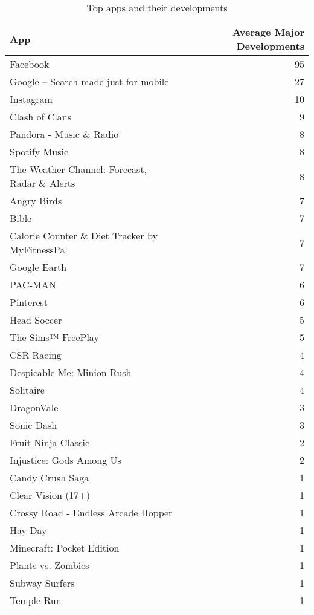 \documentclass[
]{article}
\begin{document}
\begin{table}[!h]

\caption{\label{tab:app-tab}Top apps and their developments}
\centering
\begin{tabular}[t]{l|r}
\hline
App & Average Major Developments\\
\hline
\rowcolor{gray!6}  Facebook & 95\\
\hline
Google – Search made just for mobile & 27\\
\hline
\rowcolor{gray!6}  Instagram & 10\\
\hline
Clash of Clans & 9\\
\hline
\rowcolor{gray!6}  Pandora - Music \& Radio & 8\\
\hline
Spotify Music & 8\\
\hline
\rowcolor{gray!6}  The Weather Channel: Forecast, Radar \& Alerts & 8\\
\hline
Angry Birds & 7\\
\hline
\rowcolor{gray!6}  Bible & 7\\
\hline
Calorie Counter \& Diet Tracker by MyFitnessPal & 7\\
\hline
\rowcolor{gray!6}  Google Earth & 7\\
\hline
PAC-MAN & 6\\
\hline
\rowcolor{gray!6}  Pinterest & 6\\
\hline
Head Soccer & 5\\
\hline
\rowcolor{gray!6}  The Sims™ FreePlay & 5\\
\hline
CSR Racing & 4\\
\hline
\rowcolor{gray!6}  Despicable Me: Minion Rush & 4\\
\hline
Solitaire & 4\\
\hline
\rowcolor{gray!6}  DragonVale & 3\\
\hline
Sonic Dash & 3\\
\hline
\rowcolor{gray!6}  Fruit Ninja Classic & 2\\
\hline
Injustice: Gods Among Us & 2\\
\hline
\rowcolor{gray!6}  Candy Crush Saga & 1\\
\hline
Clear Vision (17+) & 1\\
\hline
\rowcolor{gray!6}  Crossy Road - Endless Arcade Hopper & 1\\
\hline
Hay Day & 1\\
\hline
\rowcolor{gray!6}  Minecraft: Pocket Edition & 1\\
\hline
Plants vs. Zombies & 1\\
\hline
\rowcolor{gray!6}  Subway Surfers & 1\\
\hline
Temple Run & 1\\
\hline
\end{tabular}
\end{table}
\end{document}
